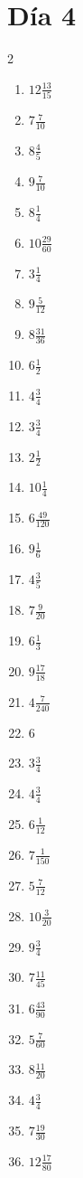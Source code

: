\documentclass[12pt]{article}
\begin{document}
\section*{Día 4}
\begin{multicols}{2}\begin{enumerate}
\item $ 12 \frac{13}{15} $
\item $ 7 \frac{7}{10} $
\item $ 8 \frac{4}{5} $
\item $ 9 \frac{7}{10} $
\item $ 8 \frac{1}{4} $
\item $ 10 \frac{29}{60} $
\item $ 3 \frac{1}{4} $
\item $ 9 \frac{5}{12} $
\item $ 8 \frac{31}{36} $
\item $ 6 \frac{1}{2} $
\item $ 4 \frac{3}{4} $
\item $ 3 \frac{3}{4} $
\item $ 2 \frac{1}{2} $
\item $ 10 \frac{1}{4} $
\item $ 6 \frac{49}{120} $
\item $ 9 \frac{1}{6} $
\item $ 4 \frac{3}{5} $
\item $ 7 \frac{9}{20} $
\item $ 6 \frac{1}{3} $
\item $ 9 \frac{17}{18} $
\item $ 4 \frac{7}{240} $
\item $ 6 $
\item $ 3 \frac{3}{4} $
\item $ 4 \frac{3}{4} $
\item $ 6 \frac{1}{12} $
\item $ 7 \frac{1}{150} $
\item $ 5 \frac{7}{12} $
\item $ 10 \frac{3}{20} $
\item $ 9 \frac{3}{4} $
\item $ 7 \frac{11}{45} $
\item $ 6 \frac{43}{90} $
\item $ 5 \frac{7}{60} $
\item $ 8 \frac{11}{20} $
\item $ 4 \frac{3}{4} $
\item $ 7 \frac{19}{30} $
\item $ 12 \frac{17}{80} $

\end{enumerate}
\end{multicols}
\end{document}
